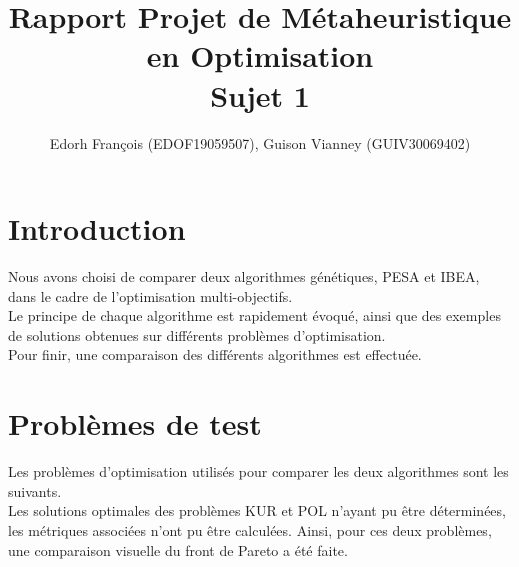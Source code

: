 \documentclass[12pt]{article}
\author{Edorh François (EDOF19059507), Guison Vianney (GUIV30069402)}
\title{Rapport Projet de Métaheuristique en Optimisation\\
  \large{Sujet 1}}
\begin{document}
\maketitle
\newpage
\tableofcontents
\newpage

\section{Introduction}
Nous avons choisi de comparer deux algorithmes génétiques, PESA et
IBEA, dans le cadre de l'optimisation multi-objectifs.\\

Le principe de chaque algorithme est rapidement évoqué, ainsi que des
exemples de solutions obtenues sur différents problèmes d'optimisation.\\

Pour finir, une comparaison des différents algorithmes est effectuée.

\newpage

\section{Problèmes de test}
Les problèmes d'optimisation utilisés pour comparer les deux
algorithmes sont les suivants.\\
Les solutions optimales des problèmes KUR et POL n'ayant pu être
déterminées, les métriques associées n'ont pu être calculées. Ainsi,
pour ces deux problèmes, une comparaison visuelle du front de Pareto a
été faite.\\
\end{document}
